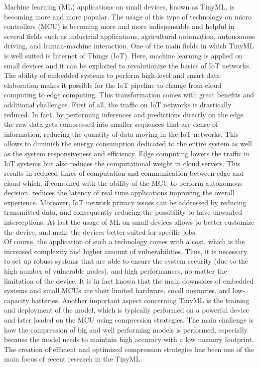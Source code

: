\documentclass[12pt]{report}
\begin{document}
\label{intro}
Machine learning (ML) applications on small devices, known as TinyML, is becoming more and more popular. The usage of this type of technology on micro controllers (MCU) is becoming more and more indispensable and helpful in several fields such as industrial applications, agricultural automation, autonomous driving, and human-machine interaction. One of the main fields in which TinyML is well suited is Internet of Things (IoT). Here, machine learning is applied on small devices and it can be exploited to revolutionize the basics of IoT networks.\\
The ability of embedded systems to perform high-level and smart data elaboration makes it possible for the IoT pipeline to change from cloud computing to edge computing. This transformation comes with great benefits and additional challenges.
First of all, the traffic on IoT networks is drastically reduced. In fact, by performing inferences and predictions directly on the edge the raw data gets compressed into smaller sequences that are dense of information, reducing the quantity of data moving in the IoT networks. This allows to diminish the energy consumption dedicated to the entire system as well as the system responsiveness and efficiency.
Edge computing lowers the traffic in IoT systems but also reduces the computational weight in cloud servers. This results in reduced times of computation and communication between edge and cloud which, if combined with the ability of the MCU to perform autonomous decision, reduces the latency of real time applications improving the overall experience.
Moreover, IoT network privacy issues can be addressed by reducing transmitted data, and consequently reducing the possibility to have unwanted interceptions.
At last the usage of ML on small devices allows to better customize the device, and make the devices better suited for specific jobs. \\
Of course, the application of such a technology comes with a cost, which is the increased complexity and higher amount of vulnerabilities. Thus, it is necessary to set up robust systems that are able to ensure the system security (due to the high number of vulnerable nodes), and high performances, no matter the limitation of the device. It is in fact known that the main downsides of embedded systems and small MCUs are their limited hardware, small memories, and low-capacity batteries. Another important aspect concerning TinyML is the training and deployment of the model, which is typically performed on a powerful device and later loaded on the MCU using compression strategies. The main challenge is how the compression of big and well performing models is performed, especially because the model needs to maintain high accuracy with a low memory footprint. The creation of efficient and optimized compression strategies has been one of the main focus of recent research in the TinyML. \\
\end{document}

